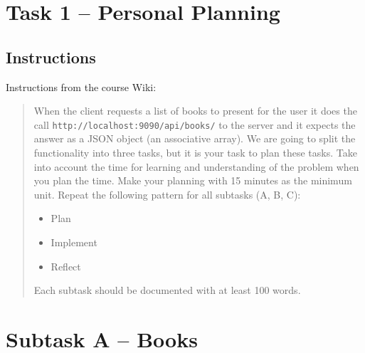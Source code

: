 %
%
%
%


\section{Task 1 -- Personal Planning}
\subsection{Instructions}\label{task-1-instructions}
Instructions from the course Wiki\cite{1dv600:lab1:instructions}:

\begin{quote}
  When the client requests a list of books to present for the user it does the
  call \texttt{http://localhost:9090/api/books/} to the server and it expects
  the answer as a JSON object (an associative array). We are going to split the
  functionality into three tasks, but it is your task to plan these tasks. Take
  into account the time for learning and understanding of the problem when you
  plan the time. Make your planning with 15 minutes as the minimum unit. Repeat
  the following pattern for all subtasks (A, B, C):

  \begin{itemize}
    \item Plan
    \item Implement
    \item Reflect
  \end{itemize}

  Each subtask should be documented with at least 100 words.
\end{quote}


\section{Subtask A -- Books}\label{task-1a}
